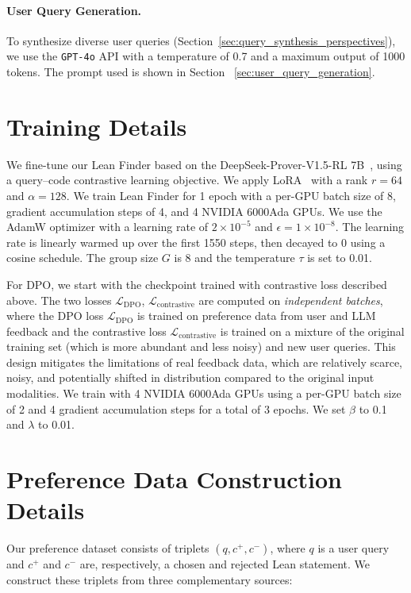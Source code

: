\documentclass{article} %
\begin{document}
\paragraph{User Query Generation.}
To synthesize diverse user queries (Section~\ref{sec:query_synthesis_perspectives}), we use the \texttt{GPT-4o} API with a temperature of 0.7 and a maximum output of 1000 tokens. The prompt used is shown in Section ~\ref{sec:user_query_generation}.

\section{Training Details}
\label{training_details}
We fine-tune our Lean Finder based on the DeepSeek-Prover-V1.5-RL 7B~\cite{xin2024deepseekv15},
using a query–code contrastive learning objective.
We apply LoRA~\cite{lora} with a rank $r=64$ and $\alpha = 128$. 
We train Lean Finder for 1 epoch with a per-GPU batch size of 8, gradient accumulation steps of 4, and 4 NVIDIA 6000Ada GPUs.
We use the AdamW optimizer with a learning rate of \(2 \times 10^{-5}\) and \(\epsilon = 1 \times 10^{-8}\).
The learning rate is linearly warmed up over the first 1550 steps, then decayed to 0 using a cosine schedule. The group size $G$ is 8 and the temperature $\tau$ is set to 0.01.


For DPO, we start with the checkpoint trained with contrastive loss described above. The two losses $\mathcal{L}_{\mathrm{DPO}}$, $\mathcal{L}_{\mathrm{contrastive}}$ are computed on \emph{independent batches}, where the DPO loss $\mathcal{L}_{\mathrm{DPO}}$ is trained on preference data from user and LLM feedback and the contrastive loss $\mathcal{L}_{\text{contrastive}}$ is trained on a mixture of the original training set (which is more abundant and less noisy) and new user queries. This design mitigates the limitations of real feedback data, which are relatively scarce, noisy, and potentially shifted in distribution compared to the original input modalities. We train with 4 NVIDIA 6000Ada GPUs using a per-GPU batch size of 2 and 4 gradient accumulation steps for a total of 3 epochs. We set $\beta$ to 0.1 and $\lambda$ to 0.01.

\section{Preference Data Construction Details}
\label{sec:preference_details}
Our preference dataset consists of triplets $(q, c^{+}, c^{-})$, where $q$ is a user query and $c^{+}$ and $c^{-}$ are, respectively, a chosen and rejected Lean statement. We construct these triplets from three complementary sources:  
\end{document}
